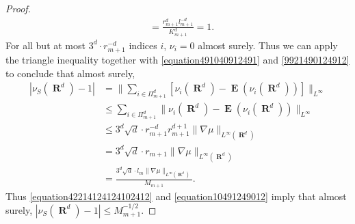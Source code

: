 \documentclass[12pt,reqno]{article}
\DeclareMathOperator{\RR}{\mathbf{R}}
\DeclareMathOperator{\EE}{\mathbf{E}}
\begin{document}
\begin{proof}
\begin{equation}
\begin{split}
        &= \frac{r_{m+1}^d l_{m+1}^{-d}}{K_{m+1}^d} = 1.
    \end{split}
    \end{equation}
    For all but at most $3^d \cdot r_{m+1}^{-d}$ indices $i$, $\nu_i = 0$ almost surely. Thus we can apply the triangle inequality together with \eqref{equation491040912491} and \eqref{9921490124912} to conclude that almost surely,
    \begin{equation} \label{equation42214124124102412}
    \begin{split}
        |\nu_S(\RR^d) - 1| &= \| \sum\nolimits_{i \in \Pi_{m+1}^d} \left[ \nu_i(\RR^d) - \EE(\nu_i(\RR^d)) \right] \|_{L^\infty} \\
        &\leq \sum\nolimits_{i \in \Pi_{m+1}^d} \| \nu_i(\RR^d) - \EE(\nu_i(\RR^d)) \|_{L^\infty}\\
        &\leq 3^d \sqrt{d} \cdot r_{m+1}^{-d} r_{m+1}^{d+1} \| \nabla \mu \|_{L^\infty(\RR^d)}\\
        &= 3^d \sqrt{d} \cdot r_{m+1} \| \nabla \mu \|_{L^\infty(\RR^d)}\\
        &= \frac{3^d \sqrt{d} \cdot l_m \| \nabla \mu \|_{L^\infty(\RR^d)}}{M_{m+1}}.
    \end{split}
    \end{equation}  
    Thus \eqref{equation42214124124102412} and \eqref{equation10491249012} imply that almost surely, $|\nu_S(\RR^d) - 1| \leq M_{m+1}^{-1/2}$.
\end{proof}
\end{document}
